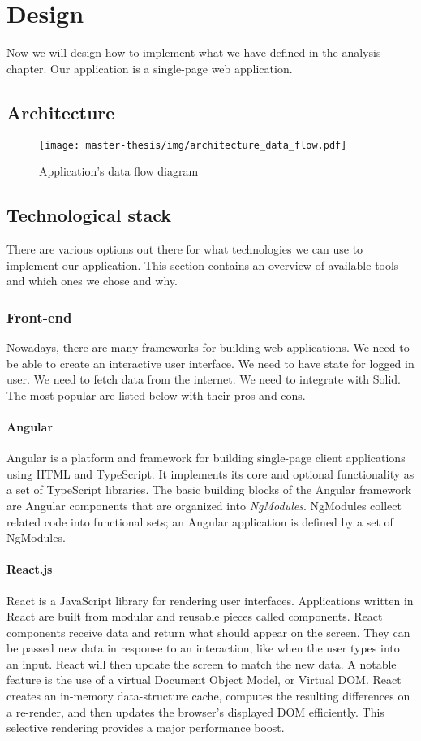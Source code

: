 \chapter{Design}
Now we will design how to implement what we have defined in the analysis chapter.
Our application is a single-page web application.

\section{Architecture}
\begin{figure}[h]
  \centering
  \texttt{[image: master-thesis/img/architecture\_data\_flow.pdf]}
  \caption{Application's data flow diagram}
\end{figure}

\section{Technological stack}
There are various options out there for what technologies we can use to implement our application.
This section contains an overview of available tools and which ones we chose and why.

\subsection{Front-end}
Nowadays, there are many frameworks for building web applications.
We need to be able to create an interactive user interface.
We need to have state for logged in user.
We need to fetch data from the internet.
We need to integrate with Solid.
The most popular are listed below with their pros and cons.

\subsubsection*{Angular}
Angular is a platform and framework for building single-page client applications using HTML and TypeScript. 
It implements its core and optional functionality as a set of TypeScript libraries. 
The basic building blocks of the Angular framework are Angular components that are organized into \emph{NgModules}. 
NgModules collect related code into functional sets; an Angular application is defined by a set of NgModules.

\subsubsection*{React.js}
React is a JavaScript library for rendering user interfaces.
Applications written in React are built from modular and reusable pieces called components.
React components receive data and return what should appear on the screen. 
They can be passed new data in response to an interaction, like when the user types into an input. 
React will then update the screen to match the new data.
A notable feature is the use of a virtual Document Object Model, or Virtual DOM. 
React creates an in-memory data-structure cache, computes the resulting differences on a re-render, and then updates the browser's displayed DOM efficiently. 
This selective rendering provides a major performance boost.

